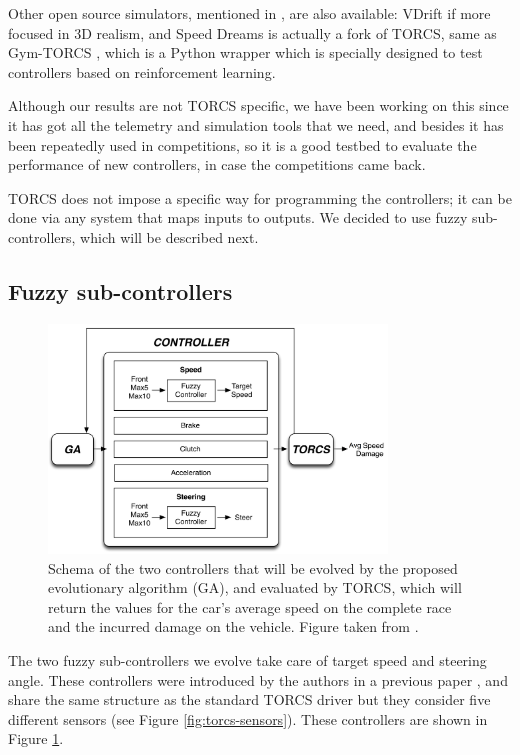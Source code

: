 \documentclass[10pt,journal,compsoc]{IEEEtran}
\begin{document}
Other open source simulators, mentioned in \cite{Loiacono:2012:LEA:2212908.2212953}, are also available: VDrift
if more focused in 3D realism, and Speed Dreams is actually a fork of
TORCS, same as Gym-TORCS \cite{yoshida2016gym}, which is a Python
wrapper which is specially designed to test controllers based on
reinforcement learning.

Although our results are not TORCS specific, we have been
working on this since it has got all the telemetry and simulation
tools that we need, and besides it has been repeatedly used in
competitions, so it is a good testbed to evaluate the performance of new controllers, in case the competitions came back.

TORCS does not impose a specific way for programming the controllers;
it can be done via any system that maps inputs to outputs. We decided
to use fuzzy sub-controllers, which will be described next.


\subsection{Fuzzy sub-controllers}
\label{subsec:fuzzy-controllers}

\begin{figure}[!ht]
  \begin{center}
    \includegraphics[width=9cm]{fig/flowchart}
  \end{center}
  \caption{Schema of the two controllers that will be evolved by the proposed 
    evolutionary algorithm (GA), and evaluated by TORCS, which will
    return the values for the car's average speed on the complete race and the incurred damage on the vehicle. Figure taken from \cite{salem_evo18}.} 
    \label{fig:ga}
\end{figure}
%
The two fuzzy sub-controllers we evolve take care of target speed and steering angle. These controllers were introduced by the authors in a previous paper \cite{salem_evo17}, and share the same structure as the standard TORCS driver but they consider five different sensors (see Figure \ref{fig:torcs-sensors}). These controllers are shown in Figure \ref{fig:ga}. 
\end{document}
